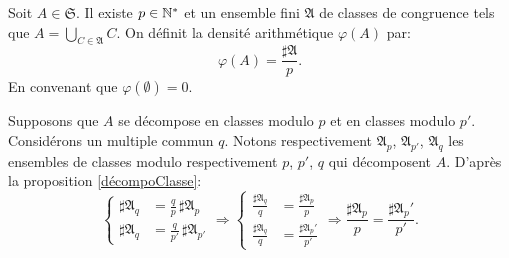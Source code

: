 \begin{defi}\label{Def:DensitClassCongr}
 Soit $A \in \mathfrak{S}$. Il existe $p \in \mathbb{N}^*$ et un ensemble fini $\mathfrak{A}$ de classes de congruence tels que $A = \bigcup_{C \in \mathfrak{A}}C$. On définit la densité arithmétique $\varphi(A)$ par:
 \begin{displaymath}
  \varphi(A) = \frac{\sharp \mathfrak{A}}{p}.
 \end{displaymath}
 En convenant que $\varphi(\emptyset) = 0$.
\end{defi}
\begin{demo}
Supposons que $A$ se décompose en classes modulo $p$ et en classes modulo $p'$. Considérons un multiple commun $q$. Notons respectivement $\mathfrak{A}_p$, $\mathfrak{A}_{p'}$, $\mathfrak{A}_q$ les ensembles de classes modulo respectivement $p$, $p'$, $q$ qui décomposent $A$. D'après la proposition \ref{décompoClasse}:
\begin{displaymath}
\left\lbrace
  \begin{aligned}
     \sharp \mathfrak{A}_q &= \frac{q}{p}  \, \sharp \mathfrak{A}_p \\
     \sharp \mathfrak{A}_q &= \frac{q}{p'} \, \sharp \mathfrak{A}_{p'}
  \end{aligned}
\right. \Rightarrow
\left\lbrace
 \begin{aligned}
    \frac{\sharp \mathfrak{A}_q}{q} &= \frac{\sharp \mathfrak{A}_p}{p} \\
    \frac{\sharp \mathfrak{A}_q}{q} &= \frac{\sharp \mathfrak{A}_p'}{p'}
 \end{aligned}
\right . \Rightarrow \frac{\sharp \mathfrak{A}_p}{p} = \frac{\sharp \mathfrak{A}_p'}{p'}.
\end{displaymath}
\end{demo}

